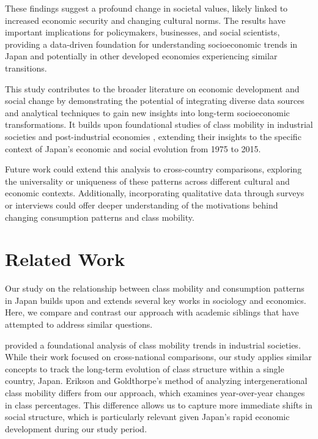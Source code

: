 \documentclass{article} %
\begin{document}
These findings suggest a profound change in societal values, likely linked to increased economic security and changing cultural norms. The results have important implications for policymakers, businesses, and social scientists, providing a data-driven foundation for understanding socioeconomic trends in Japan and potentially in other developed economies experiencing similar transitions.

This study contributes to the broader literature on economic development and social change by demonstrating the potential of integrating diverse data sources and analytical techniques to gain new insights into long-term socioeconomic transformations. It builds upon foundational studies of class mobility in industrial societies \citep{Erikson1993TheCF} and post-industrial economies \citep{Esping-Andersen1993ChangingC}, extending their insights to the specific context of Japan's economic and social evolution from 1975 to 2015.

Future work could extend this analysis to cross-country comparisons, exploring the universality or uniqueness of these patterns across different cultural and economic contexts. Additionally, incorporating qualitative data through surveys or interviews could offer deeper understanding of the motivations behind changing consumption patterns and class mobility.

\section{Related Work}
\label{sec:related}

Our study on the relationship between class mobility and consumption patterns in Japan builds upon and extends several key works in sociology and economics. Here, we compare and contrast our approach with academic siblings that have attempted to address similar questions.

\citet{Erikson1993TheCF} provided a foundational analysis of class mobility trends in industrial societies. While their work focused on cross-national comparisons, our study applies similar concepts to track the long-term evolution of class structure within a single country, Japan. Erikson and Goldthorpe's method of analyzing intergenerational class mobility differs from our approach, which examines year-over-year changes in class percentages. This difference allows us to capture more immediate shifts in social structure, which is particularly relevant given Japan's rapid economic development during our study period.
\end{document}
